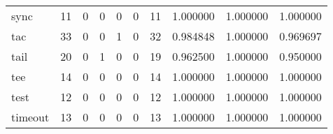 \begin{tabular}{lrrrrrrrrr}
sync      &                                      11 &                                                  0 &                                                  0 &                                                  0 &                                                  0 &                                                 11 &                                           1.000000 &                               1.000000 &                             1.000000 \\
tac       &                                      33 &                                                  0 &                                                  0 &                                                  1 &                                                  0 &                                                 32 &                                           0.984848 &                               1.000000 &                             0.969697 \\
tail      &                                      20 &                                                  0 &                                                  1 &                                                  0 &                                                  0 &                                                 19 &                                           0.962500 &                               1.000000 &                             0.950000 \\
tee       &                                      14 &                                                  0 &                                                  0 &                                                  0 &                                                  0 &                                                 14 &                                           1.000000 &                               1.000000 &                             1.000000 \\
test      &                                      12 &                                                  0 &                                                  0 &                                                  0 &                                                  0 &                                                 12 &                                           1.000000 &                               1.000000 &                             1.000000 \\
timeout   &                                      13 &                                                  0 &                                                  0 &                                                  0 &                                                  0 &                                                 13 &                                           1.000000 &                               1.000000 &                             1.000000 \\

\end{tabular}

